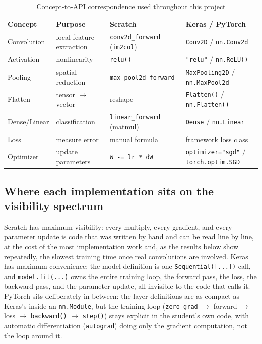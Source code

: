 \documentclass[11pt]{article}
\newcommand{\code}[1]{\texttt{#1}}
\begin{document}
\begin{table}[H]
\centering
\caption{Concept-to-API correspondence used throughout this project}
\label{tab:concept-api}
\small
\begin{tabular}{@{}p{2.3cm}p{3.4cm}p{3.7cm}p{3.7cm}@{}}
\toprule
Concept & Purpose & Scratch & Keras / PyTorch \\
\midrule
Convolution & local feature extraction & \code{conv2d\_forward} (\code{im2col}) & \code{Conv2D} / \code{nn.Conv2d} \\
Activation & nonlinearity & \code{relu()} & \code{"relu"} / \code{nn.ReLU()} \\
Pooling & spatial reduction & \code{max\_pool2d\_forward} & \code{MaxPooling2D} / \code{nn.MaxPool2d} \\
Flatten & tensor $\to$ vector & reshape & \code{Flatten()} / \code{nn.Flatten()} \\
Dense/Linear & classification & \code{linear\_forward} (matmul) & \code{Dense} / \code{nn.Linear} \\
Loss & measure error & manual formula & framework loss class \\
Optimizer & update parameters & \code{W -= lr * dW} & \code{optimizer="sgd"} / \code{torch.optim.SGD} \\
\bottomrule
\end{tabular}
\end{table}

\subsection{Where each implementation sits on the visibility spectrum}

Scratch has maximum visibility: every multiply, every gradient, and every
parameter update is code that was written by hand and can be read line by
line, at the cost of the most implementation work and, as the results below
show repeatedly, the slowest training time once real convolutions are
involved. Keras has maximum convenience: the model definition is one
\code{Sequential([...])} call, and \code{model.fit(...)} owns the entire
training loop, the forward pass, the loss, the backward pass, and the
parameter update, all invisible to the code that calls it. PyTorch sits
deliberately in between: the layer definitions are as compact as Keras's
inside an \code{nn.Module}, but the training loop
(\code{zero\_grad} $\to$ forward $\to$ loss $\to$ \code{backward()} $\to$
\code{step()}) stays explicit in the student's own code, with automatic
differentiation (\code{autograd}) doing only the gradient computation, not
the loop around it.
\end{document}

